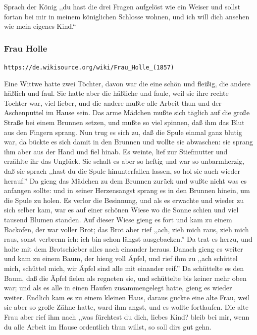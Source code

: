 \documentclass[10pt,a4paper]{article}
\begin{document}
\vskip 4pt
Sprach der König ,,du hast die drei Fragen aufgelöst wie ein Weiser und sollst
fortan bei mir in meinem königlichen Schlosse wohnen, und ich will dich ansehen
wie mein eigenes Kind.“

\subsubsection{Frau Holle}

\verb+https://de.wikisource.org/wiki/Frau_Holle_(1857)+

\vskip 4pt
Eine Wittwe hatte zwei Töchter, davon war die eine schön und fleißig, die andere
häßlich und faul. Sie hatte aber die häßliche und faule, weil sie ihre rechte
Tochter war, viel lieber, und die andere mußte alle Arbeit thun und der
Aschenputtel im Hause sein. Das arme Mädchen mußte sich täglich auf die große
Straße bei einem Brunnen setzen, und mußte so viel spinnen, daß ihm das Blut aus
den Fingern sprang. Nun trug es sich zu, daß die Spule einmal ganz blutig war,
da bückte es sich damit in den Brunnen und wollte sie abwaschen: sie sprang ihm
aber aus der Hand und fiel hinab. Es weinte, lief zur Stiefmutter und erzählte
ihr das Unglück. Sie schalt es aber so heftig und war so unbarmherzig, daß sie
sprach ,,hast du die Spule hinunterfallen lassen, so hol sie auch wieder herauf.''
Da gieng das Mädchen zu dem Brunnen zurück und wußte nicht was es anfangen
sollte: und in seiner Herzensangst sprang es in den Brunnen hinein, um die Spule
zu holen. Es verlor die Besinnung, und als es erwachte und wieder zu sich selber
kam, war es auf einer schönen Wiese wo die Sonne schien und viel tausend Blumen
standen. Auf dieser Wiese gieng es fort und kam zu einem Backofen, der war
voller Brot; das Brot aber rief ,,ach, zieh mich raus, zieh mich raus, sonst
verbrenn ich: ich bin schon längst ausgebacken.'' Da trat es herzu, und holte
mit dem Brotschieber alles nach einander heraus. Danach gieng es weiter und kam
zu einem Baum, der hieng voll Äpfel, und rief ihm zu ,,ach schüttel mich,
schüttel mich, wir Äpfel sind alle mit einander reif.'' Da schüttelte es den
Baum, daß die Äpfel fielen als regneten sie, und schüttelte bis keiner mehr oben
war; und als es alle in einen Haufen zusammengelegt hatte, gieng es wieder
weiter. Endlich kam es zu einem kleinen Haus, daraus guckte eine alte Frau,
weil sie aber so große Zähne hatte, ward ihm angst, und es wollte fortlaufen.
Die alte Frau aber rief ihm nach ,,was fürchtest du dich, liebes Kind? bleib bei
mir, wenn du alle Arbeit im Hause ordentlich thun willst, so soll dirs gut gehn.
\end{document}
